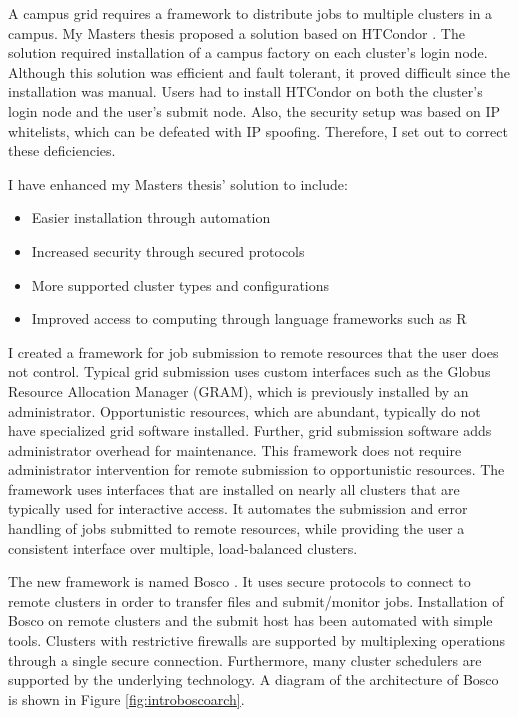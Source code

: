A campus grid requires a framework to distribute jobs to multiple clusters in a campus.  My Masters thesis \cite{weitzel2011campus} proposed a solution based on HTCondor \cite{litzkow1988condor}.  The solution required installation of a campus factory \cite{website:campusfactory} on each cluster's login node.  Although this solution was efficient and fault tolerant, it proved difficult since the installation was manual.  Users had to install HTCondor on both the cluster's login node and the user's submit node.  Also, the security setup was based on IP whitelists, which can be defeated with IP spoofing.  Therefore, I set out to correct these deficiencies.

I have enhanced my Masters thesis' solution to include:
\begin{itemize}
\item Easier installation through automation
\item Increased security through secured protocols
\item More supported cluster types and configurations
\item Improved access to computing through language frameworks such as R \cite{team2005r}
\end{itemize}

I created a framework for job submission to remote resources that the user does not control.  Typical grid submission uses custom interfaces such as the Globus Resource Allocation Manager \cite{foster1999globus} (GRAM), which is previously installed by an administrator.  Opportunistic resources, which are abundant, typically do not have specialized grid software installed.  Further, grid submission software adds administrator overhead for maintenance.  This framework does not require administrator intervention for remote submission to opportunistic resources.  The framework uses interfaces that are installed on nearly all clusters that are typically used for interactive access.  It automates the submission and error handling of jobs submitted to remote resources, while providing the user a consistent interface over multiple, load-balanced clusters.

The new framework is named Bosco \cite{weitzel2014accessing}.  It uses secure protocols to connect to remote clusters in order to transfer files and submit/monitor jobs.  Installation of Bosco on remote clusters and the submit host has been automated with simple tools.  Clusters with restrictive firewalls are supported by multiplexing operations through a single secure connection.  Furthermore, many cluster schedulers are supported by the underlying technology.  A diagram of the architecture of Bosco is shown in Figure \ref{fig:introboscoarch}.

